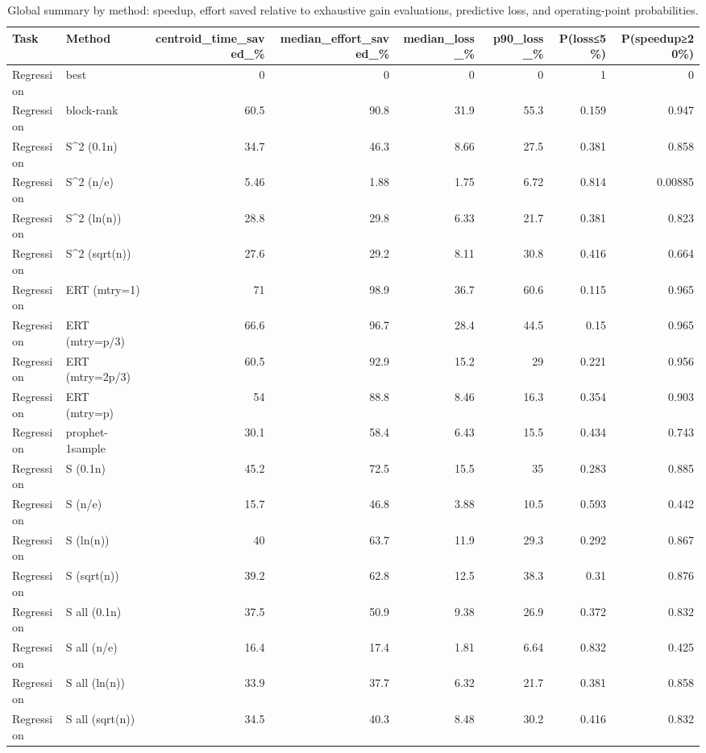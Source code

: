 \begin{table}[t]
\centering
\caption{Global summary by method: speedup, effort saved relative to exhaustive gain evaluations, predictive loss, and operating-point probabilities.}
\label{tab:global-summary}
\begin{tabular}{llrrrrrr}
\toprule
Task & Method & centroid\_time\_saved\_\% & median\_effort\_saved\_\% & median\_loss\_\% & p90\_loss\_\% & P(loss≤5\%) & P(speedup≥20\%) \\
\midrule
Regression & best & 0 & 0 & 0 & 0 & 1 & 0 \\
Regression & block-rank & 60.5 & 90.8 & 31.9 & 55.3 & 0.159 & 0.947 \\
Regression & S^2 (0.1n) & 34.7 & 46.3 & 8.66 & 27.5 & 0.381 & 0.858 \\
Regression & S^2 (n/e) & 5.46 & 1.88 & 1.75 & 6.72 & 0.814 & 0.00885 \\
Regression & S^2 (ln(n)) & 28.8 & 29.8 & 6.33 & 21.7 & 0.381 & 0.823 \\
Regression & S^2 (sqrt(n)) & 27.6 & 29.2 & 8.11 & 30.8 & 0.416 & 0.664 \\
Regression & ERT (mtry=1) & 71 & 98.9 & 36.7 & 60.6 & 0.115 & 0.965 \\
Regression & ERT (mtry=p/3) & 66.6 & 96.7 & 28.4 & 44.5 & 0.15 & 0.965 \\
Regression & ERT (mtry=2p/3) & 60.5 & 92.9 & 15.2 & 29 & 0.221 & 0.956 \\
Regression & ERT (mtry=p) & 54 & 88.8 & 8.46 & 16.3 & 0.354 & 0.903 \\
Regression & prophet-1sample & 30.1 & 58.4 & 6.43 & 15.5 & 0.434 & 0.743 \\
Regression & S (0.1n) & 45.2 & 72.5 & 15.5 & 35 & 0.283 & 0.885 \\
Regression & S (n/e) & 15.7 & 46.8 & 3.88 & 10.5 & 0.593 & 0.442 \\
Regression & S (ln(n)) & 40 & 63.7 & 11.9 & 29.3 & 0.292 & 0.867 \\
Regression & S (sqrt(n)) & 39.2 & 62.8 & 12.5 & 38.3 & 0.31 & 0.876 \\
Regression & S all (0.1n) & 37.5 & 50.9 & 9.38 & 26.9 & 0.372 & 0.832 \\
Regression & S all (n/e) & 16.4 & 17.4 & 1.81 & 6.64 & 0.832 & 0.425 \\
Regression & S all (ln(n)) & 33.9 & 37.7 & 6.32 & 21.7 & 0.381 & 0.858 \\
Regression & S all (sqrt(n)) & 34.5 & 40.3 & 8.48 & 30.2 & 0.416 & 0.832 \\

\end{tabular}
\end{table}
